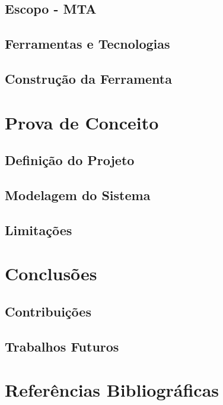 \documentclass{beamer}
\begin{document}
\subsection[Escopo - MTA]{Escopo - MTA}

\subsection[Ferramentas e Tecnologias]{Ferramentas e Tecnologias}

\subsection[Construção da Ferramenta]{Construção da Ferramenta}

\section{Prova de Conceito}

\subsection[Definição do Projeto]{Definição do Projeto}

\subsection[Modelagem do Sistema]{Modelagem do Sistema}

\subsection[Limitações]{Limitações}

\section{Conclusões}

\subsection[Contribuições]{Contribuições}

\subsection[Trabalhos Futuros]{Trabalhos Futuros}

\section{Referências Bibliográficas}

\begin{frame}[allowframebreaks]





\end{frame}
\end{document}
